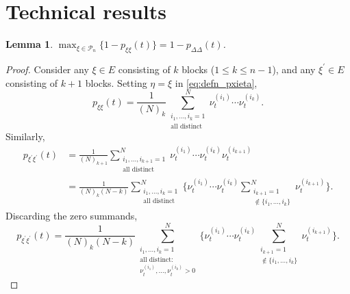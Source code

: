 \documentclass[12pt,authoryear]{article}
\newtheorem{lemma}{Lemma}
\theoremstyle{definition}
\newcommand{\1}[1]{\mathbbm{1}_{#1}}
\begin{document}
\begin{landscape}
\begin{figure}[omitted: a diagram of this paper's results, not reproduced here]\label{fig:weakconv_structure}\end{figure}
\end{landscape}

\section{Technical results}\label{sec:technical_results}

\begin{lemma}\label{thm:maximum_pr}
$\max_{\xi\in \mathcal{P}_n} \{1 - p_{\xi\xi}(t)\} = 1 - p_{\Delta\Delta}(t)$.
\end{lemma}

\begin{proof}
Consider any $\xi \in E$ consisting of $k$ blocks ($1\leq k\leq n-1$), and any $\xi^\prime\in E$ consisting of $k+1$ blocks. 
Setting $\eta=\xi$ in \eqref{eq:defn_pxieta},
\begin{equation*}
p_{\xi\xi}(t) 
= \frac{1}{(N)_k} \sum_{\substack{i_1,\dots,i_k=1 \\ \text{all distinct}}}^N 
        \nu_t^{(i_1)} \cdots \nu_t^{(i_k)} .
\end{equation*}
Similarly,
\begin{align*}
p_{\xi^\prime\xi^\prime}(t) &= \frac{1}{(N)_{k+1}} 
        \sum_{\substack{i_1,\dots, i_{k+1} =1 \\ \text{all distinct}}}^N 
        \nu_t^{(i_1)} \cdots \nu_t^{(i_k)} \nu_t^{(i_{k+1})} \\
&= \frac{1}{(N)_k(N-k)} \sum_{\substack{i_1,\dots,i_k =1 \\ \text{all distinct}}}^N 
        \Bigg\{ \nu_t^{(i_1)} \cdots \nu_t^{(i_k)} 
        \sum_{\substack{i_{k+1}=1 \\ \notin \{i_1,\ldots, i_k\} }}^N 
        \nu_t^{(i_{k+1})} \Bigg\} .
\end{align*}
Discarding the zero summands,
\begin{equation*}
p_{\xi^\prime\xi^\prime}(t) 
    = \frac{1}{(N)_k(N-k)} \sum_{\substack{i_1,\dots,i_k =1 \\ \text{all distinct:} 
        \\ \nu_t^{(i_1)},\dots,\nu_t^{(i_k)} > 0 }}^N
        \Bigg\{ \nu_t^{(i_1)} \cdots \nu_t^{(i_k)} 
        \sum_{\substack{i_{k+1}=1 \\ \notin \{i_1,\ldots, i_k\} }}^N 
        \nu_t^{(i_{k+1})} \Bigg\} .

\end{equation*}
\end{proof}
\end{document}
